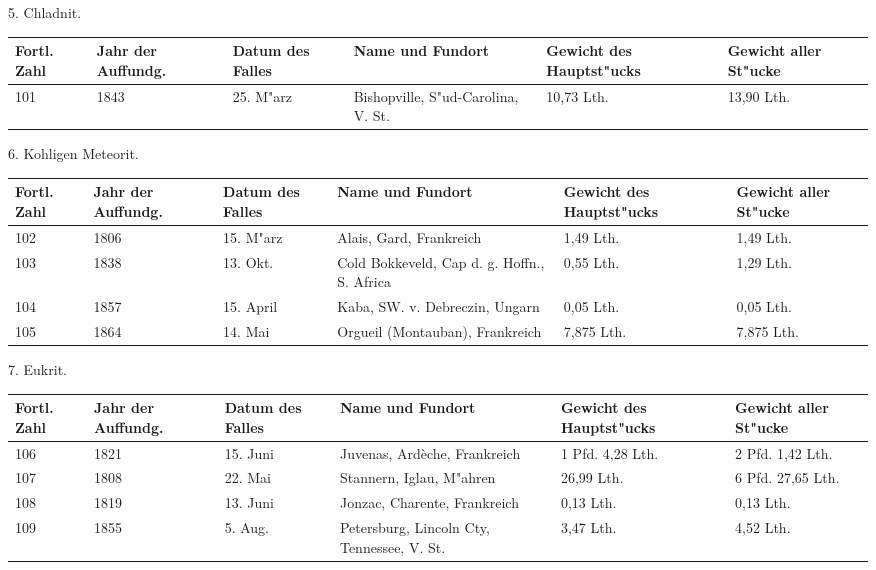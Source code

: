 \documentclass[a4paper, 11pt, oneside]{article}
\begin{document}
\clearpage
\begin{center}
5. Chladnit.
\end{center}
\begin{center}
\begin{footnotesize}
\begin{tabular}{ |p{7mm}|p{7mm}|p{13mm}|p{48mm}|p{22mm}|p{22mm}| }
    \hline
    Fortl. Zahl & Jahr der Auffundg. & Datum des Falles & Name und Fundort & Gewicht des Hauptst"ucks & Gewicht aller St"ucke\\
    \hline\hline
    101 & 1843 & 25. M"arz & Bishopville, S"ud-Carolina, V. St. & 10,73 Lth. & 13,90 Lth.\\
    \hline
\end{tabular}
\end{footnotesize}
\end{center}
\begin{center}
6. Kohligen Meteorit.
\end{center}
\begin{center}
\begin{footnotesize}
\begin{tabular}{ |p{7mm}|p{7mm}|p{13mm}|p{48mm}|p{22mm}|p{22mm}| }
    \hline
    Fortl. Zahl & Jahr der Auffundg. & Datum des Falles & Name und Fundort & Gewicht des Hauptst"ucks & Gewicht aller St"ucke\\
    \hline\hline
    102 & 1806 & 15. M"arz & Alais, Gard, Frankreich & 1,49 Lth. & 1,49 Lth.\\\hline
    103 & 1838 & 13. Okt. & Cold Bokkeveld, Cap d. g. Hoffn., S. Africa & 0,55 Lth. & 1,29 Lth.\\\hline
    104 & 1857 & 15. April & Kaba, SW. v. Debreczin, Ungarn & 0,05 Lth. & 0,05 Lth.\\\hline
    105 & 1864 & 14. Mai & Orgueil (Montauban), Frankreich & 7,875 Lth. & 7,875 Lth.\\
    \hline
\end{tabular}
\end{footnotesize}
\end{center}
\begin{center}
7. Eukrit.
\end{center}
\begin{center}
\begin{footnotesize}
\begin{tabular}{ |p{7mm}|p{7mm}|p{13mm}|p{48mm}|p{22mm}|p{22mm}| }
    \hline
    Fortl. Zahl & Jahr der Auffundg. & Datum des Falles & Name und Fundort & Gewicht des Hauptst"ucks & Gewicht aller St"ucke\\
    \hline\hline
    106 & 1821 & 15. Juni & Juvenas, Ardèche, Frankreich & 1 Pfd. 4,28 Lth. & 2 Pfd. 1,42 Lth.\\\hline
    107 & 1808 & 22. Mai & Stannern, Iglau, M"ahren & 26,99 Lth. & 6 Pfd. 27,65 Lth.\\\hline
    108 & 1819 & 13. Juni & Jonzac, Charente, Frankreich & 0,13 Lth. & 0,13 Lth.\\\hline
    109 & 1855 & 5. Aug. & Petersburg, Lincoln Cty, Tennessee, V. St. & 3,47 Lth. & 4,52 Lth.\\
    \hline
\end{tabular}
\end{footnotesize}
\end{center}
\end{document}
